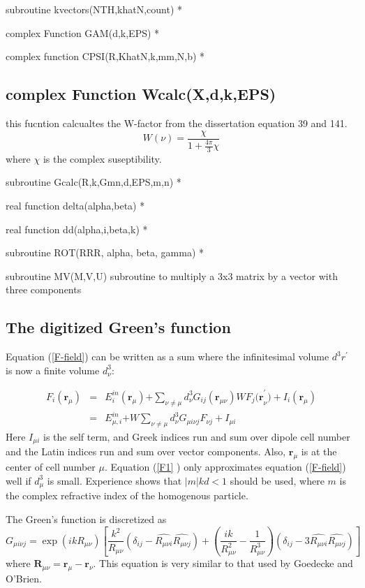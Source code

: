 \documentclass{article}
\begin{document}
subroutine kvectors(NTH,khatN,count) *

complex Function GAM(d,k,EPS) *

complex function CPSI(R,KhatN,k,mm,N,b) *

\subsection{complex Function Wcalc(X,d,k,EPS)}

this fucntion calcualtes the W-factor from the dissertation equation 39 and
141.%
\[
W\left( \nu \right) =\frac{\chi }{1+\frac{4\pi }{3}\chi } 
\]%
where $\chi $ is the complex suseptibility.

subroutine Gcalc(R,k,Gmn,d,EPS,m,n) *

real function delta(alpha,beta) *

real function dd(alpha,i,beta,k) *

subroutine ROT(RRR, alpha, beta, gamma) *

subroutine MV(M,V,U) subroutine to multiply a 3x3 matrix by a vector with
three components

\subsection{The digitized Green's function}

Equation (\ref{F-field}) can be written as a sum where the infinitesimal
volume $d^{3}r^{\prime }$ is now a finite volume $d_{\nu }^{3}$:

\begin{eqnarray}
F_{i}(\mathbf{r}_{\mu }) &=&E_{i}^{in}\left( \mathbf{r}_{\mu }\right) 
\mathbf{+}\sum\limits_{\nu \neq \mu }d_{\nu }^{3}G_{ij}\left( \mathbf{r}%
_{\mu \nu }\right) WF_{j}\mathbf{(r}_{\nu }^{\prime })+I_{i}(\mathbf{r}_{\mu
})  \label{F1} \\
&=&E_{\mu ,i}^{in}\mathbf{+}W\sum\limits_{\nu \neq \mu }d_{\nu }^{3}G_{\mu
i\nu j}F_{\nu j}+I_{\mu i}  \nonumber
\end{eqnarray}
Here $I_{\mu i}$ is the self term, and Greek indices run and sum over dipole
cell number and the Latin indices run and sum over vector components. Also, $%
\mathbf{r}_{\mu }$ is at the center of cell number $\mu .$ Equation (\ref{F1}%
) only approximates equation (\ref{F-field}) well if $d_{\mu }^{3}$ is
small. Experience shows that $\left| m\right| kd<1$ should be used, where $m$
is the complex refractive index of the homogenous particle.

The Green's function is discretized as 
\begin{equation}
G_{\mu i\nu j}=\exp (ikR_{\mu \nu })\left[ \frac{k^{2}}{R_{\mu \nu }}\left(
\delta _{ij}-\widehat{R_{\mu \nu i}}\widehat{R_{\mu \nu j}}\right) +\left( 
\frac{ik}{R_{\mu \nu }^{2}}-\frac{1}{R_{\mu \nu }^{3}}\right) \left( \delta
_{ij}-3\widehat{R_{\mu \nu i}}\widehat{R_{\mu \nu j}}\right) \right]
\end{equation}
where $\mathbf{R}_{\mu \nu }=\mathbf{r}_{\mu }-\mathbf{r}_{\nu }.$ This
equation is very similar to that used by Goedecke and O'Brien.\cite%
{Goedecke88}
\end{document}
